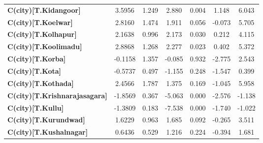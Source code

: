 \begin{center}
\begin{tabular}{lcccccc}
\textbf{C(city)[T.Kidangoor]}                                                                       &       3.5956  &        1.249     &     2.880  &         0.004        &        1.148    &        6.043     \\
\textbf{C(city)[T.Koelwar]}                                                                         &       2.8160  &        1.474     &     1.911  &         0.056        &       -0.073    &        5.705     \\
\textbf{C(city)[T.Kolhapur]}                                                                        &       2.1638  &        0.996     &     2.173  &         0.030        &        0.212    &        4.115     \\
\textbf{C(city)[T.Koolimadu]}                                                                       &       2.8868  &        1.268     &     2.277  &         0.023        &        0.402    &        5.372     \\
\textbf{C(city)[T.Korba]}                                                                           &      -0.1158  &        1.357     &    -0.085  &         0.932        &       -2.775    &        2.543     \\
\textbf{C(city)[T.Kota]}                                                                            &      -0.5737  &        0.497     &    -1.155  &         0.248        &       -1.547    &        0.399     \\
\textbf{C(city)[T.Kothada]}                                                                         &       2.4566  &        1.787     &     1.375  &         0.169        &       -1.045    &        5.958     \\
\textbf{C(city)[T.Krishnarajasagara]}                                                               &      -1.8569  &        0.367     &    -5.063  &         0.000        &       -2.576    &       -1.138     \\
\textbf{C(city)[T.Kullu]}                                                                           &      -1.3809  &        0.183     &    -7.538  &         0.000        &       -1.740    &       -1.022     \\
\textbf{C(city)[T.Kurundwad]}                                                                       &       1.6229  &        0.963     &     1.685  &         0.092        &       -0.265    &        3.511     \\
\textbf{C(city)[T.Kushalnagar]}                                                                     &       0.6436  &        0.529     &     1.216  &         0.224        &       -0.394    &        1.681     \\

\end{tabular}
\end{center}
